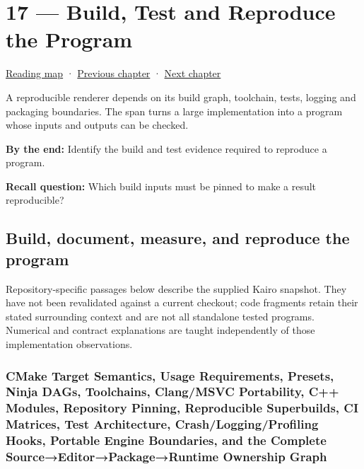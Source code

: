 \hypertarget{03-visual-computing-i-ch017}{}
\chapter{17 --- Build, Test and Reproduce the Program}\label{03-visual-computing-i-ch017-build-test-and-reproduce-the-program}

\hyperref[volume-reading-map]{Reading map} · \hyperref[03-visual-computing-i-ch016-gpu-memory-divergence-and-execution-order]{Previous chapter} · \hyperref[03-visual-computing-i-ch018-c-representation-ownership-and-lifetime]{Next chapter}

A reproducible renderer depends on its build graph, toolchain, tests, logging and packaging boundaries. The span turns a large implementation into a program whose inputs and outputs can be checked.

\textbf{By the end:} Identify the build and test evidence required to reproduce a program.

\textbf{Recall question:} Which build inputs must be pinned to make a result reproducible?

\section{Build, document, measure, and reproduce the program}\label{03-visual-computing-i-ch017-build-document-measure-and-reproduce-the-program}

Repository-specific passages below describe the supplied Kairo snapshot. They have not been revalidated against a current checkout; code fragments retain their stated surrounding context and are not all standalone tested programs. Numerical and contract explanations are taught independently of those implementation observations.

\subsection{CMake Target Semantics, Usage Requirements, Presets, Ninja DAGs, Toolchains, Clang/MSVC Portability, C++ Modules, Repository Pinning, Reproducible Superbuilds, CI Matrices, Test Architecture, Crash/Logging/Profiling Hooks, Portable Engine Boundaries, and the Complete Source→Editor→Package→Runtime Ownership Graph}\label{03-visual-computing-i-ch017-cmake-target-semantics-usage-requirements-presets-ninja-dags-toolchains-clangmsvc-portability-c-modules-repository-pinning-reproducible-superbuilds-ci-matrices-test-architecture-crashloggingprofiling-hooks-portable-engine-boundaries-and-the-complete-sourceeditorpackageruntime-ownership-graph}

